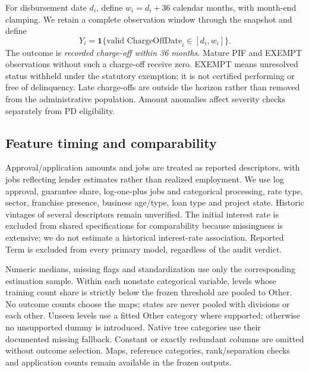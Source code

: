 For disbursement date $d_i$, define $w_i=d_i+36$ calendar months, with month-end clamping. We retain a complete observation window through the snapshot and define
\[Y_i=\mathbf{1}\{\text{valid ChargeOffDate}_i\in[d_i,w_i]\}.\]
The outcome is \emph{recorded charge-off within 36 months}. Mature PIF and EXEMPT observations without such a charge-off receive zero. EXEMPT means unresolved status withheld under the statutory exemption; it is not certified performing or free of delinquency. Late charge-offs are outside the horizon rather than removed from the administrative population. Amount anomalies affect severity checks separately from PD eligibility.


\subsection{Feature timing and comparability}
Approval/application amounts and jobs are treated as reported descriptors, with jobs reflecting lender estimates rather than realized employment. We use log approval, guarantee share, log-one-plus jobs and categorical processing, rate type, sector, franchise presence, business age/type, loan type and project state. Historic vintages of several descriptors remain unverified. The initial interest rate is excluded from shared specifications for comparability because missingness is extensive; we do not estimate a historical interest-rate association. Reported Term is excluded from every primary model, regardless of the audit verdict.


Numeric medians, missing flags and standardization use only the corresponding estimation sample. Within each nonstate categorical variable, levels whose training count share is strictly below the frozen threshold are pooled to Other. No outcome counts choose the maps; states are never pooled with divisions or each other. Unseen levels use a fitted Other category where supported; otherwise no unsupported dummy is introduced. Native tree categories use their documented missing fallback. Constant or exactly redundant columns are omitted without outcome selection. Maps, reference categories, rank/separation checks and application counts remain available in the frozen outputs.

